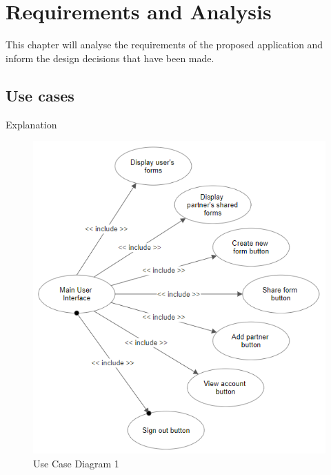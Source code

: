 \chapter{Requirements and Analysis} \label{Chapter:three}

This chapter will analyse the requirements of the proposed application and inform the design decisions that have been made.

\section{Use cases}
Explanation

    \begin{figure}
        \center
        \includegraphics{../figures/UseCaseInterface}
        \caption{Use Case Diagram 1}
    \end{figure}

